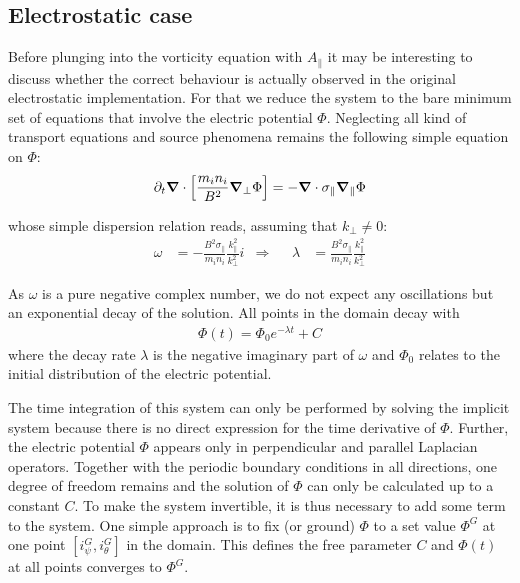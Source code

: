 \subsection{Electrostatic case}
Before plunging into the vorticity equation with $A_\parallel$ it may be interesting to discuss whether the correct behaviour is actually observed in the original electrostatic implementation. For that we reduce the system to the bare minimum set of equations that involve the electric potential $\Phi$. Neglecting all kind of transport equations and source phenomena remains the following simple equation on $\Phi$: \\
\begin{equation}
		\partial_t\grad\cdot\left[\frac{m_in_i}{B^2}\grad_\perp\Phi\right] = -\grad\cdot\sigma_\parallel\grad_\parallel\Phi \label{eq:AdvectionSLAB_PHI}
\end{equation}

whose simple dispersion relation reads, assuming that $k_\perp \ne 0$:
\begin{align}
	\omega &= -\frac{B^2\sigma_\parallel}{m_in_i}\frac{k_\parallel^2}{k_\perp^2}i &\Rightarrow&& \lambda &= \frac{B^2\sigma_\parallel}{m_in_i}\frac{k_\parallel^2}{k_\perp^2}
\label{eq:AdvectionSLAB_dispersionRelation}
\end{align}

As $\omega$ is a pure negative complex number, we do not expect any oscillations but an exponential decay of the solution. All points in the domain decay with 
\begin{align}
	\Phi(t) = \Phi_0 e^{-\lambda t} + C \label{eq:electrostaticSLABdecay}
\end{align} 
where the decay rate $\lambda$ is the negative imaginary part of $\omega$ and $\Phi_0$ relates to the initial distribution of the electric potential.

The time integration of this system can only be performed by solving the implicit system because there is no direct expression for the time derivative of $\Phi$. Further, the electric potential $\Phi$ appears only in perpendicular and parallel Laplacian operators. Together with the periodic boundary conditions in all directions, one degree of freedom remains and the solution of $\Phi$ can only be calculated up to a constant $C$. To make the system invertible, it is thus necessary to add some term to the system. One simple approach is to fix (or ground) $\Phi$ to a set value $\Phi^G$ at one point $[i_\psi^G, i_\theta^G]$ in the domain. This defines the free parameter $C$ and $\Phi(t)$ at all points converges to $\Phi^G$. 

